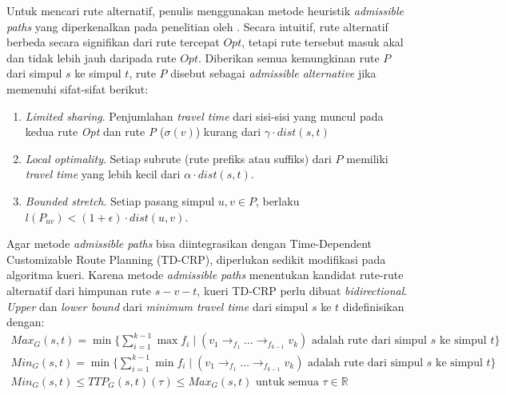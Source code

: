 Untuk mencari rute alternatif, penulis menggunakan metode heuristik \textit{admissible paths} yang diperkenalkan pada penelitian oleh \cite{Abraham2010}. Secara intuitif, rute alternatif berbeda secara signifikan dari rute tercepat $Opt$, tetapi rute tersebut masuk akal dan tidak lebih jauh daripada rute $Opt$. Diberikan semua kemungkinan rute $P$ dari simpul $s$ ke simpul $t$, rute $P$ disebut sebagai \textit{admissible alternative} jika memenuhi sifat-sifat berikut:
\begin{enumerate}
    \item \textit{Limited sharing}. Penjumlahan \textit{travel time} dari sisi-sisi yang muncul pada kedua rute \textit{Opt} dan rute \textit{P} ($\sigma(v)$) kurang dari $\gamma \cdot dist(s,t)$ 
    \item \textit{Local optimality}. Setiap subrute (rute prefiks atau suffiks) dari $P$ memiliki \textit{travel time} yang lebih kecil dari $\alpha \cdot dist(s,t)$.
    \item \textit{Bounded stretch}. Setiap pasang simpul $u,v\in P$, berlaku $l(P_{uv})< (1+\epsilon)\cdot dist(u,v)$. 
\end{enumerate}

Agar metode \textit{admissible paths} bisa diintegrasikan dengan Time-Dependent Customizable Route Planning (TD-CRP), diperlukan sedikit modifikasi pada algoritma kueri. Karena metode \textit{admissible paths} menentukan kandidat rute-rute alternatif dari himpunan rute $s-v-t$, kueri TD-CRP perlu dibuat \textit{bidirectional}. \textit{Upper} dan \textit{lower bound} dari \textit{minimum travel time } dari simpul $s$ ke $t$ didefinisikan dengan:
\begin{align}
    Max_{G}(s,t)=\min \{ \sum_{i=1}^{k-1} \max f_i \mid (v_1 \rightarrow_{f_1} \ldots \rightarrow_{f_{k-1}} v_k ) \text{ adalah rute dari simpul } s \text{ ke simpul } t \} \\ 
    Min_{G}(s,t)=\min \{ \sum_{i=1}^{k-1} \min f_i \mid (v_1 \rightarrow_{f_1} \ldots \rightarrow_{f_{k-1}} v_k ) \text{ adalah rute dari simpul } s \text{ ke simpul } t \} \\
    Min_{G}(s,t)\leq TTP_G(s,t)(\tau)\leq Max_G(s,t) \text{ untuk semua } \tau\in \mathbb{R}
\end{align}



